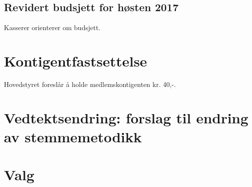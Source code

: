 \documentclass[10pt,norsk,a4paper]{article}
\begin{document}
\subsection{Revidert budsjett for høsten 2017}
Kasserer orienterer om budsjett.


\section{Kontigentfastsettelse}
Hovedstyret foreslår å holde medlemskontigenten kr. 40,-.

\section{Vedtektsendring: forslag til endring av stemmemetodikk}

\section{Valg}
\end{document}
